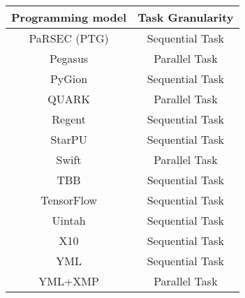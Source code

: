 \begin{tabular}{cc}
\hline
Programming model & Task Granularity \\
\hline
PaRSEC (PTG) & Sequential Task\\
Pegasus & Parallel Task\\
PyGion & Sequential Task\\
QUARK & Parallel Task\\
Regent & Sequential Task\\
StarPU & Sequential Task\\
Swift & Parallel Task\\
TBB & Sequential Task\\
TensorFlow & Sequential Task\\
Uintah & Sequential Task\\
X10 & Sequential Task\\
YML & Sequential Task\\
YML+XMP & Parallel Task\\
\hline
\end{tabular}
